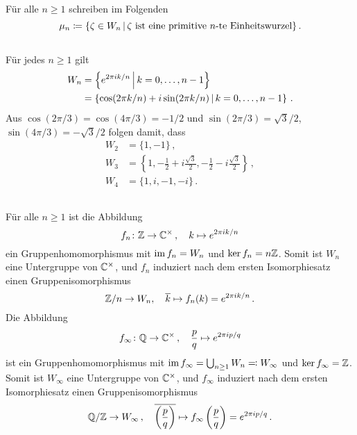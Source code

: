 \section{}

Für alle $n \geq 1$ schreiben im Folgenden
\[
            \mu_n
  \coloneqq \{
              \zeta \in W_n
            \suchthat
              \text{$\zeta$ ist eine primitive $n$-te Einheitswurzel}
            \} \,.
\]





\subsection{}

Für jedes $n \geq 1$ gilt
\begin{align*}
    W_n
  &=  \left\{
        e^{2 \pi i  k / n}
      \suchthat*
        k = 0, \dotsc, n-1
      \right\}
  \\
  &=  \left\{
        \cos(2 \pi k / n) + i \sin(2 \pi k /n )
      \suchthat*
        k = 0, \dotsc, n-1
      \right\} \,.
\end{align*}
Aus $\cos(2 \pi /3) = \cos(4 \pi / 3)  = -1/2$ und $\sin(2 \pi / 3) = \sqrt{3}/2$, $\sin(4 \pi /3) = -\sqrt{3}/2$ folgen damit, dass
\begin{align*}
  W_2 &= \{ 1, -1 \} \,, \\
  W_3 &= \left\{ 1, -\frac{1}{2} + i \frac{\sqrt{3}}{2}, -\frac{1}{2} - i \frac{\sqrt{3}}{2} \right\} \,, \\
  W_4 &= \{ 1, i, -1, -i \} \,.
\end{align*}





\subsection{}

Für alle $n \geq 1$ ist die Abbildung
\[
          f_n
  \colon  \mathbb{Z}
  \to     \mathbb{C}^\times \,,
  \quad   k
  \mapsto e^{2 \pi i k / n}
\]
ein Gruppenhomomorphismus mit $\operatorname{im} f_n = W_n$ und $\ker f_n = n \mathbb{Z}$.
Somit ist $W_n$ eine Untergruppe von $\mathbb{C}^\times$, und $f_n$ induziert nach dem ersten Isomorphiesatz einen Gruppenisomorphismus
\[
          \mathbb{Z}/n
  \to     W_n,
  \quad   \overline{k}
  \mapsto f_n(k)
  =       e^{2 \pi i k / n} \,.
\]
Die Abbildung
\[
          f_\infty
  \colon  \mathbb{Q}
  \to     \mathbb{C}^\times \,,
  \quad   \frac{p}{q}
  \mapsto e^{2 \pi i p /q}
\]
ist ein Gruppenhomomorphismus mit $\operatorname{im} f_\infty = \bigcup_{n \geq 1} W_n \eqqcolon W_\infty$ und $\ker f_\infty = \mathbb{Z}$.
Somit ist $W_\infty$ eine Untergruppe von $\mathbb{C}^\times$, und $f_\infty$ induziert nach dem ersten Isomorphiesatz einen Gruppenisomorphismus
\[
          \mathbb{Q}/\mathbb{Z}
  \to     W_\infty \,,
  \quad   \overline{ \left( \frac{p}{q} \right) }
  \mapsto f_\infty\left( \frac{p}{q} \right)
  =       e^{2 \pi i p /q} \,.
\]

